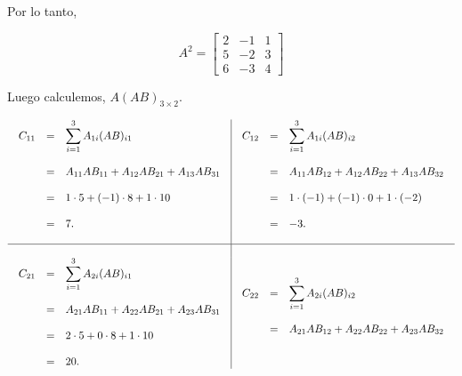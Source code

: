 \begin{enumerate}[1.]
       Por lo tanto,

       $$A^2=\left[\begin{array}{rrr}
	   2 & -1 & 1\\
	   5 & -2 & 3\\
	   6 & -3 & 4
	   \end{array}\right]$$

       Luego calculemos, $A(AB)_{3\times 2}$.

       $$
       \begin{array}{c|c}
	   \begin{array}{rcl}
	       C_{11} &=& \displaystyle \sum_{i=1}^3 A_{1i}(AB)_{i1}\\\\
		      &=& A_{11}AB_{11} + A_{12}AB_{21} + A_{13}AB_{31}\\\\
		      &=& 1\cdot 5 + (-1)\cdot 8 + 1\cdot 10\\\\
		      &=& 7.
	   \end{array}
	   &
	   \begin{array}{rcl}
	       C_{12} &=& \displaystyle \sum_{i=1}^3 A_{1i}(AB)_{i2}\\\\
		      &=& A_{11}AB_{12} + A_{12}AB_{22} + A_{13}AB_{32}\\\\
		      &=& 1\cdot (-1) + (-1)\cdot 0 + 1\cdot (-2)\\\\
		      &=& -3.
	   \end{array}\\\\
	   \hline\\
	   \begin{array}{rcl}
	       C_{21} &=& \displaystyle \sum_{i=1}^3 A_{2i}(AB)_{i1}\\\\
		      &=& A_{21}AB_{11} + A_{22}AB_{21} + A_{23}AB_{31}\\\\
		      &=& 2\cdot 5 + 0\cdot 8 + 1\cdot 10\\\\
		      &=& 20.
	   \end{array}
	   &
	   \begin{array}{rcl}
	       C_{22} &=& \displaystyle \sum_{i=1}^3 A_{2i}(AB)_{i2}\\\\
		      &=& A_{21}AB_{12} + A_{22}AB_{22} + A_{23}AB_{32}\\\\

\end{array}
\end{array}$$
\end{enumerate}
